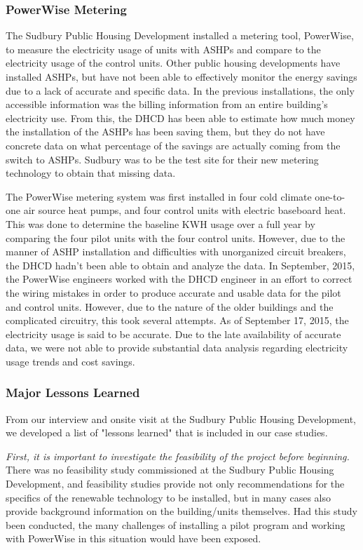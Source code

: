 \subsubsection{PowerWise Metering}
\par The Sudbury Public Housing Development installed a metering tool, PowerWise, to measure the electricity usage of units with ASHPs and compare to the electricity usage of the control units. Other public housing developments have installed ASHPs, but have not been able to effectively monitor the energy savings due to a lack of accurate and specific data. In the previous installations, the only accessible information was the billing information from an entire building's electricity use. From this, the DHCD has been able to estimate how much money the installation of the ASHPs has been saving them, but they do not have concrete data on what percentage of the savings are actually coming from the switch to ASHPs. Sudbury was to be the test site for their new metering technology to obtain that missing data.
\par The PowerWise metering system was first installed in four cold climate one-to-one air source heat pumps, and four control units with electric baseboard heat. This was done to determine the baseline KWH usage over a full year by comparing the four pilot units with the four control units. However, due to the manner of ASHP installation and difficulties with unorganized circuit breakers, the DHCD hadn't been able to obtain and analyze the data.  In September, 2015, the PowerWise engineers worked with the DHCD engineer in an effort to correct the wiring mistakes in order to produce accurate and usable data for the pilot and control units. However, due to the nature of the older buildings and the complicated circuitry, this took several attempts. As of September 17, 2015, the electricity usage is said to be accurate. Due to the late availability of accurate data, we were not able to provide substantial data analysis regarding electricity usage trends and cost savings.

\subsubsection{Major Lessons Learned}
\par From our interview and onsite visit at the Sudbury Public Housing Development, we developed a list of "lessons learned" that is included in our case studies.
\par \emph{First, it is important to investigate the feasibility of the project before beginning.} There was no feasibility study commissioned at the Sudbury Public Housing Development, and feasibility studies provide not only recommendations for the specifics of the renewable technology to be installed, but in many cases also provide background information on the building/units themselves. Had this study been conducted, the many challenges of installing a pilot program and working with PowerWise in this situation would have been exposed.

